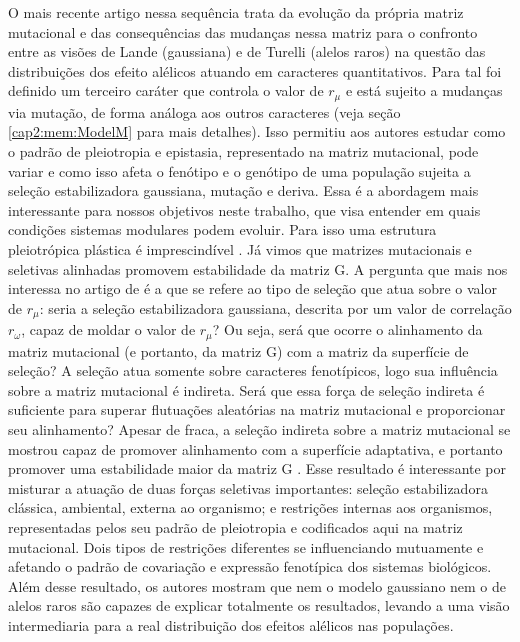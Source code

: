 O mais recente artigo nessa sequência \citep{Jones2007} trata da
evolução da própria matriz mutacional e das consequências das mudanças
nessa matriz para o confronto entre as visões de Lande (gaussiana) e de
Turelli (alelos raros) na questão das distribuições dos efeito alélicos
atuando em caracteres quantitativos. 
Para tal foi definido um terceiro caráter que controla o valor de
$r_\mu$ e está sujeito a mudanças via mutação, de forma análoga aos
outros caracteres (veja seção \ref{cap2:mem:ModelM} para mais detalhes). 
Isso permitiu aos autores estudar como o padrão de pleiotropia e
epistasia, representado na matriz mutacional, pode variar e como isso
afeta o fenótipo e o genótipo de uma população sujeita a seleção
estabilizadora gaussiana, mutação e deriva. 
Essa é a abordagem mais interessante para nossos objetivos neste
trabalho, que visa entender em quais condições sistemas modulares podem
evoluir. 
Para isso uma estrutura pleiotrópica plástica é imprescindível
\citep{Wagner1996, Pavlicev2011a}. 
Já vimos que matrizes mutacionais e seletivas alinhadas promovem
estabilidade da matriz G. 
A pergunta que mais nos interessa no artigo de \cite{Jones2007} é a que
se refere ao tipo de seleção que atua sobre o valor de $r_\mu$: seria a
seleção estabilizadora gaussiana, descrita por um valor de correlação
$r_\omega$, capaz de moldar o valor de $r_\mu$? 
Ou seja, será que ocorre o alinhamento da matriz mutacional (e portanto,
da matriz G)  com a matriz da superfície de seleção? 
A seleção atua somente sobre caracteres fenotípicos, logo sua influência
sobre a matriz mutacional é indireta. 
Será que essa força de seleção indireta é suficiente para superar
flutuações aleatórias na matriz mutacional e proporcionar seu
alinhamento? Apesar de fraca, a seleção indireta sobre a matriz
mutacional se mostrou capaz de promover alinhamento com a superfície
adaptativa, e portanto promover uma estabilidade maior da matriz G
\citep{Jones2007}. 
Esse resultado é interessante por misturar a atuação de duas forças
seletivas importantes: seleção estabilizadora clássica, ambiental,
externa ao organismo; e restrições internas aos organismos,
representadas pelos seu padrão de pleiotropia e codificados aqui na
matriz mutacional. 
Dois tipos de restrições diferentes se influenciando mutuamente e
afetando o padrão de covariação e expressão fenotípica dos sistemas
biológicos. 
Além desse resultado, os autores mostram que nem o modelo gaussiano nem
o de alelos raros são capazes de explicar totalmente os resultados,
levando a uma visão intermediaria para a real distribuição dos efeitos
alélicos nas populações. 

